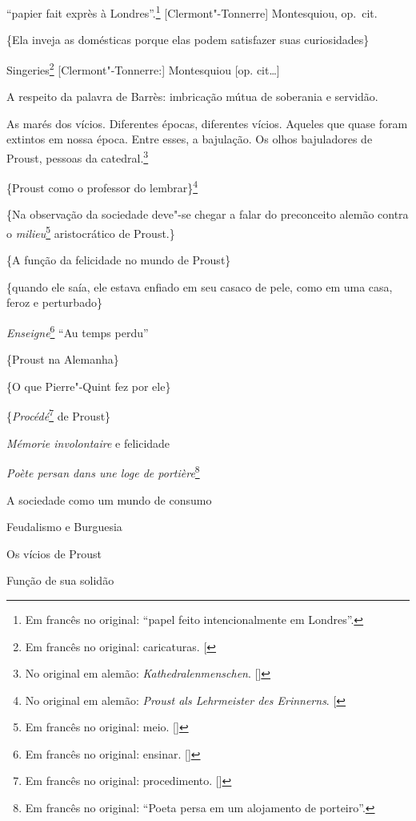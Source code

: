 ``papier fait exprès à Londres''.\footnote{Em francês no original: ``papel feito intencionalmente em Londres''. \versal{[N.~T.]}} {[}Clermont"-Tonnerre{]} Montesquiou, op.~cit.

\{Ela inveja as domésticas porque elas podem satisfazer suas
curiosidades\}

Singeries\footnote{Em francês no original: caricaturas. {[}\versal{N.~T.}{]}} {[}Clermont"-Tonnerre:{]} Montesquiou {[}op. cit\ldots{}{]}

A respeito da palavra de Barrès: imbricação mútua de soberania e
servidão.

As marés dos vícios. Diferentes épocas, diferentes vícios. Aqueles que
quase foram extintos em nossa época. Entre esses, a bajulação. Os olhos
bajuladores de Proust, pessoas da catedral.\footnote{No original em alemão: \emph{Kathedralenmenschen}. []}

\{Proust como o professor do lembrar\}\footnote{No original em alemão: \emph{Proust als Lehrmeister des Erinnerns}. {[}\versal{N.~T.}{]}}

\{Na observação da sociedade deve"-se chegar a falar do preconceito
alemão contra o \emph{milieu}\footnote{Em francês no original: meio. []} aristocrático de Proust.\}

\{A função da felicidade no mundo de Proust\}

\{quando ele saía, ele estava enfiado em seu casaco de pele, como em uma
casa, feroz e perturbado\}

\medskip

\noindent{}\emph{Enseigne}\footnote{Em francês no original: ensinar. []} ``Au temps perdu''

\noindent{}\{Proust na Alemanha\}

\noindent{}\{O que Pierre"-Quint fez por ele\}

\noindent{}\{\emph{Procédé}\footnote{Em francês no original: procedimento. []} de Proust\}

\noindent{}\emph{Mémorie involontaire} e felicidade

\noindent{}\emph{Poète persan dans une loge de portière}\footnote{Em francês no original: ``Poeta
  persa em um alojamento de porteiro''. \versal{[N.~T.]}}

\noindent{}A sociedade como um mundo de consumo

\noindent{}Feudalismo e Burguesia

\noindent{}Os vícios de Proust

\noindent{}Função de sua solidão

